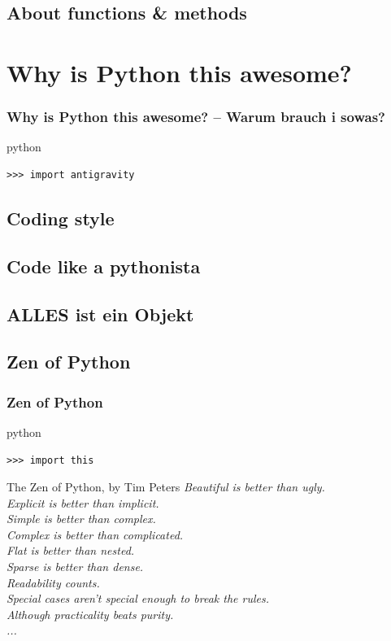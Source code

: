 \documentclass{beamer}
\begin{document}
\subsection{About functions \& methods}

\section{Why is Python this awesome?}
\begin{frame}[fragile]
    \frametitle{Why is Python this awesome? -- Warum brauch i sowas?}

    \begin{exampleblock}{python}
    \begin{lstlisting}
>>> import antigravity
    \end{lstlisting}
    \end{exampleblock}
\end{frame}

\subsection{Coding style}
\subsection{Code like a pythonista} 
\subsection{ALLES ist ein Objekt}
\subsection{Zen of Python} 
\begin{frame}
    \frametitle{Zen of Python}

    \begin{exampleblock}{python}
    \begin{lstlisting}
>>> import this
    \end{lstlisting}
    \end{exampleblock}

    \begin{block}{The Zen of Python, by Tim Peters}
    \scriptsize
    \emph{
    Beautiful is better than ugly.\\
    Explicit is better than implicit.\\
    Simple is better than complex.\\
    Complex is better than complicated.\\
    Flat is better than nested.\\
    Sparse is better than dense.\\
    Readability counts.\\
    Special cases aren't special enough to break the rules.\\
    Although practicality beats purity.\\
    ...}
    \end{block}

\end{frame}
\end{document}
